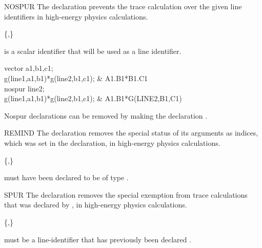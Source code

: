 \begin{Declaration}{NOSPUR}
The  declaration prevents the trace calculation over the given
line identifiers in high-energy physics calculations.
\begin{Syntax}
 \{,\}\optional
\end{Syntax}


 is a scalar identifier that will be used as a line identifier.

\begin{Examples}
vector a1,b1,c1; \\
g(line1,a1,b1)*g(line2,b1,c1);      &     A1.B1*B1.C1 \\
nospur line2; \\
g(line1,a1,b1)*g(line2,b1,c1);      &     A1.B1*G(LINE2,B1,C1)
\end{Examples}

\begin{Comments}
Nospur declarations can be removed by making the declaration .
\end{Comments}
\end{Declaration}


\begin{Declaration}{REMIND}
The  declaration removes the special status of its arguments
as indices, which was set in the  declaration, in
high-energy physics calculations.
\begin{Syntax}
 \{,\}\optional
\end{Syntax}

 must have been declared to be of type .
\end{Declaration}


\begin{Declaration}{SPUR}
The  declaration removes the special exemption from trace
calculations that was declared by , in high-energy physics
calculations.
\begin{Syntax}
 \{,\}\optional
\end{Syntax}

 must be a line-identifier that has previously been declared
.
\end{Declaration}


